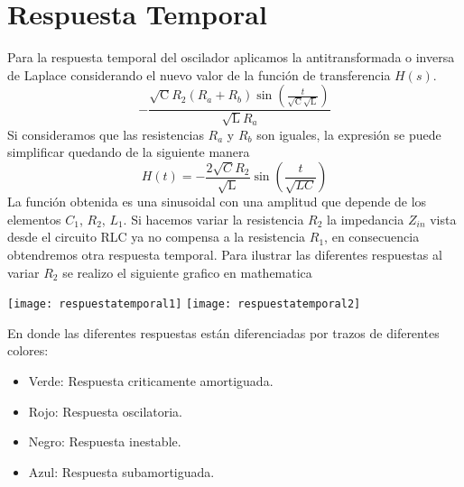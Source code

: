 \documentclass[10pt,a4paper]{article} %
\begin{document}
\section{Respuesta Temporal}
Para la respuesta temporal del oscilador aplicamos la antitransformada o inversa de Laplace considerando el nuevo valor de la función de transferencia $H(s)$.
\begin{equation*}
-\frac{\sqrt{\text{C}} R_{2} (R_{a}+R_{b}) \sin \left(\frac{t}{\sqrt{\text{C}} \sqrt{\text{L}}}\right)}{\sqrt{\text{L}} R_{a}}
\end{equation*}
Si consideramos que las resistencias $R_{a}$ y $R_{b}$ son iguales, la expresión se puede simplificar quedando de la siguiente manera
\begin{equation*}
H(t)=-\frac{2 \sqrt{C} R_{2}}{\sqrt{\text{L}}} \sin \left(\frac{t}{\sqrt{LC}}\right)
\end{equation*}
La función obtenida es una sinusoidal con una amplitud que depende de los elementos $C_{1}$, $R_{2}$, $L_{1}$.
Si hacemos variar la resistencia $R_{2}$ la impedancia $Z_{in}$ vista desde el circuito RLC ya no compensa a la resistencia $R_{1}$, en consecuencia obtendremos otra respuesta temporal. Para ilustrar las diferentes respuestas al variar $R_{2}$ se realizo el siguiente grafico en mathematica
\begin{center}
	\texttt{[image: respuestatemporal1]}
	\texttt{[image: respuestatemporal2]}
\end{center}	
En donde las diferentes respuestas están diferenciadas por trazos de diferentes colores:
\begin{itemize}
	\item Verde: Respuesta criticamente amortiguada.
	\item Rojo: Respuesta oscilatoria.
	\item Negro: Respuesta inestable.
	\item Azul: Respuesta subamortiguada. 
\end{itemize}

\end{document}
